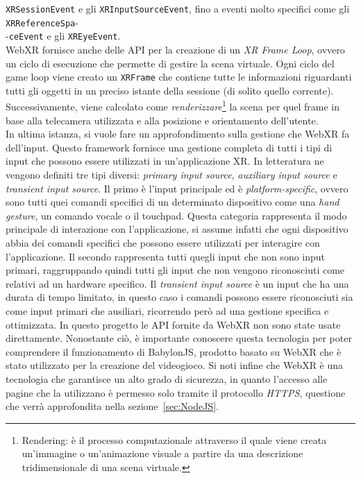 \texttt{XRSessionEvent} e gli \texttt{XRInputSourceEvent}, fino a eventi molto specifici come gli \texttt{XRReferenceSpa}-\\-\texttt{ceEvent} e gli \texttt{XREyeEvent}.\\
WebXR fornisce anche delle API per la creazione di un \textit{XR Frame Loop}, ovvero un ciclo di esecuzione che permette di gestire la scena virtuale. Ogni
ciclo del game loop viene creato un \texttt{XRFrame} che contiene tutte le informazioni riguardanti tutti gli oggetti in un preciso istante della sessione (di solito quello corrente).
Successivamente, viene calcolato come \textit{renderizzare}\footnote{Rendering: è il processo computazionale attraverso il quale viene creata un'immagine o un'animazione visuale a 
partire da una descrizione tridimensionale di una scena virtuale.} la scena per quel frame in base alla telecamera utilizzata e alla posizione e orientamento dell'utente.\\
\newline
In ultima istanza, si vuole fare un approfondimento sulla gestione che WebXR fa dell'input. Questo framework fornisce una gestione completa di tutti i tipi di input che possono
essere utilizzati in un'applicazione XR. In letteratura ne vengono definiti tre tipi diversi: \textit{primary input source}, \textit{auxiliary input source} e \textit{transient
input source}. Il primo è l'input principale ed è \textit{platform-specific}, ovvero sono tutti quei comandi specifici di un determinato dispositivo come una \textit{hand gesture},
un comando vocale o il touchpad. Questa categoria rappresenta il modo principale di interazione con l'applicazione, si assume infatti che ogni dispositivo abbia dei comandi specifici
che possono essere utilizzati per interagire con l'applicazione. Il secondo rappresenta tutti quegli input che non sono input primari, raggruppando quindi tutti gli input
che non vengono riconosciuti come relativi ad un hardware specifico. Il \textit{transient input source} è un input che ha una durata di tempo limitato, in questo caso i comandi
possono essere riconosciuti sia come input primari che ausiliari, ricorrendo però ad una gestione specifica e ottimizzata.
\newline \newline
In questo progetto le API fornite da WebXR non sono state usate direttamente. Nonostante ciò, è importante conoscere questa tecnologia per poter comprendere il funzionamento
di BabylonJS, prodotto basato su WebXR che è stato utilizzato per la creazione del videogioco. Si noti infine che WebXR è una tecnologia che garantisce un alto grado di sicurezza, in quanto l'accesso alle pagine che la utilizzano è permesso solo tramite il protocollo \textit{HTTPS}, questione che verrà approfondita nella sezione~\ref{sec:NodeJS}. 

